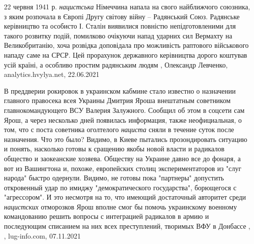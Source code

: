 22 червня 1941 р. \emph{нацистська} Німеччина напала на свого найближчого союзника, з
яким розпочала в Європі Другу світову війну – Радянський Союз. Радянське
керівництво та особисто І. Сталін виявилися повністю непідготовленими для такого
розвитку подій, помилково очікуючи напад ударних сил Вермахту на
Великобританію, хоча розвідка доповідала про можливість раптового військового
нападу саме на СРСР. Цей прорахунок державного керівництва дорого коштував усій
країні, а особливо простим радянським людям
, 
Олександр Левченко, analytics.hvylya.net, 22.06.2021

В преддверии рокировок в украинском кабмине стало известно о назначении
главного правосека всея Украины Дмитрия Яроша внештатным советником
главнокомандующего ВСУ Валерия Залужного. Сообщил об этом в соцсети сам Ярош, а
через несколько дней появилась информация, также неофициальная, о том, что с
поста советника оголтелого \emph{нациста} сняли в течение суток после назначения. Что
это было? Видимо, в Киеве пытались прозондировать ситуацию и понять, насколько
готовы к сращению якобы новой власти и радикалов общество и заокеанские
хозяева. Обществу на Украине давно все до фонаря, а вот из Вашингтона и,
похоже, европейских столиц экспериментаторов из "слуг народа" быстро одернули.
Видимо, не готовы пока "партнеры" допустить откровенный удар по имиджу
"демократического государства", борющегося с "агрессором". И это несмотря на
то, что имеющий достаточный авторитет среди \emph{нацистских} отморозков Ярош вполне
смог бы помочь украинскому военному командованию решить вопросы с интеграцией
радикалов в армию и последующим списанием на них всех преступлений, творимых
ВФУ в Донбассе
, 
, lug-info.com, 07.11.2021
